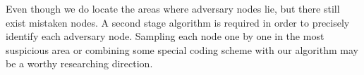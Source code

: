 \documentclass[conference]{IEEEtran}
\begin{document}
Even though we do locate the areas where adversary nodes lie, but there still exist mistaken nodes. A second stage algorithm is required in order to precisely identify each adversary node. Sampling each node one by one in the most suspicious area or combining some special coding scheme with our algorithm may be a worthy researching direction.



\end{document}
